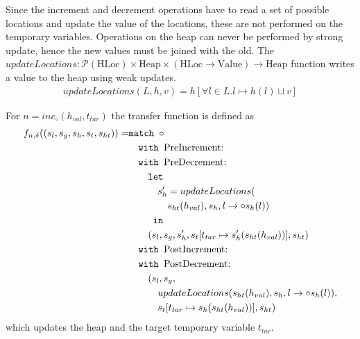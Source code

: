 Since the increment and decrement operations have to read a set of possible locations and update the value of the locations, these are not performed on the temporary variables. Operations on the heap can never be performed by strong update, hence the new values must be joined with the old. The $updateLocations:\mathcal{P}(\text{HLoc}) \times \text{Heap} \times (\text{HLoc}\rightarrow\text{Value})\rightarrow \text{Heap}$ function writes a value to the heap using weak updates.
\begin{align}
updateLocations(L,h, v) = h[\forall l \in L. l \mapsto h(l)\sqcup v]
\end{align}

For $n = \mathit{inc}_\circ(h_{val},t_{tar})$ the transfer function is defined as
\begin{align}
f_{n,\delta}((s_l, s_g, s_h, s_t, s_{ht})) =     & \texttt{match }\circ\notag\\
                                & \quad\texttt{with }\text{PreIncrement}\text{: } \notag\\
                                & \quad\texttt{with }\text{PreDecrement}\text{: } \notag\\
                                & \quad\quad\texttt{let } \notag\\
                                & \quad\quad\quad s_h' = updateLocations(\notag\\
                                & \quad\quad\quad\quad s_{ht}(h_{val}), s_h, l\rightarrow \circ s_h(l))\notag\\
                                & \quad\quad  \texttt{ in }\notag\\
                                & \quad\quad (s_l, s_g, s_h',s_t[t_{tar}\mapsto s_h'(s_{ht}(h_{val}))], s_{ht})\notag\\
                                & \quad\texttt{with }\text{PostIncrement}\text{: } \notag\\
                                & \quad\texttt{with }\text{PostDecrement}\text{: } \notag\\
                                & \quad\quad (s_l, s_g, \notag\\
                                & \quad\quad\quad updateLocations(s_{ht}(h_{val}), s_h, l\rightarrow \circ s_h(l)),\notag\\
                                & \quad\quad\quad s_t[t_{tar}\mapsto s_h(s_{ht}(h_{val}))], s_{ht})
\end{align}
which updates the heap and the target temporary variable $t_{tar}$.

